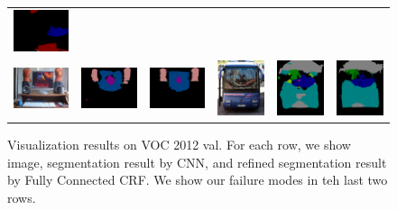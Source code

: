 \begin{figure}[!htbp]
{\begin{tabular}{c c c | c c c}
    \includegraphics[height=0.12\linewidth]{fig/res_crf/2007_000529.png} \\
    \includegraphics[height=0.12\linewidth]{fig/img/2007_000559.jpg} &
    \includegraphics[height=0.12\linewidth]{fig/res_none/2007_000559.png} &
    \includegraphics[height=0.12\linewidth]{fig/res_crf/2007_000559.png} &
    \includegraphics[height=0.12\linewidth]{fig/img/2007_000663.jpg} &
    \includegraphics[height=0.12\linewidth]{fig/res_none/2007_000663.png} &
    \includegraphics[height=0.12\linewidth]{fig/res_crf/2007_000663.png} \\    
  \end{tabular}
  }
  \caption{Visualization results on VOC 2012 val. For each row, we show image, segmentation result by CNN, and refined segmentation result by Fully Connected CRF. We show our failure modes in teh last two rows.} 
  \label{fig:ValResults}
\end{figure}
